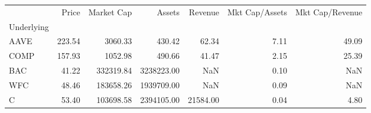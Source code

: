 \begin{tabular}{lrrrrrr}
\toprule
{} &   Price &  Market Cap &      Assets &   Revenue &  Mkt Cap/Assets &  Mkt Cap/Revenue \\
Underlying &         &             &             &           &                 &                  \\
\midrule
AAVE       &  223.54 &     3060.33 &      430.42 &     62.34 &            7.11 &            49.09 \\
COMP       &  157.93 &     1052.98 &      490.66 &     41.47 &            2.15 &            25.39 \\
BAC        &   41.22 &   332319.84 &  3238223.00 &       NaN &            0.10 &              NaN \\
WFC        &   48.46 &   183658.26 &  1939709.00 &       NaN &            0.09 &              NaN \\
C          &   53.40 &   103698.58 &  2394105.00 &  21584.00 &            0.04 &             4.80 \\
\bottomrule
\end{tabular}
